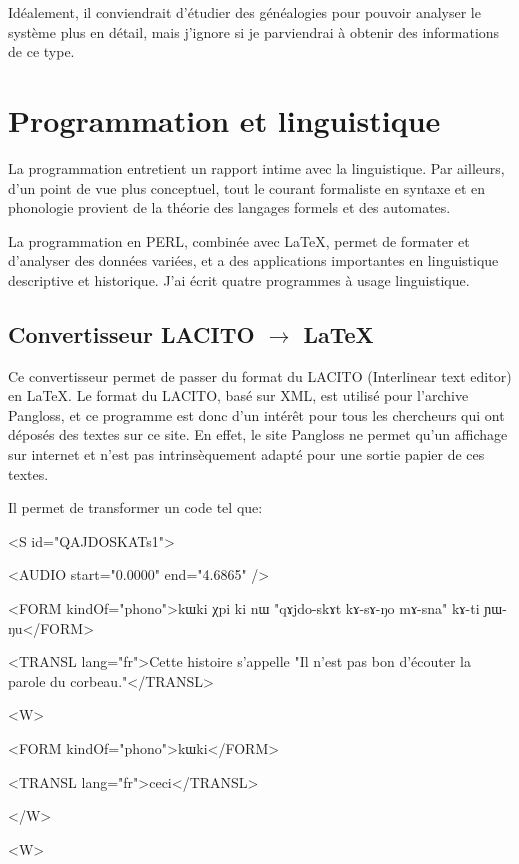 \documentclass[oldfontcommands,oneside,a4paper,11pt]{memoir}
\begin{document}
Idéalement, il conviendrait d'étudier des généalogies pour pouvoir analyser le système plus en détail, mais j'ignore si je parviendrai à obtenir des informations de ce type.
 
\chapter{Programmation et linguistique}
La programmation entretient un rapport intime avec la linguistique.  Par ailleurs, d'un point de vue plus conceptuel, tout le courant formaliste en syntaxe et en phonologie provient de la théorie des langages formels et des automates. 



La programmation en PERL, combinée avec \LaTeX, permet de formater et d'analyser des données variées, et a des applications importantes en linguistique descriptive et   historique. J'ai écrit quatre programmes à usage linguistique.


\section{Convertisseur LACITO $\rightarrow $ \LaTeX}
Ce convertisseur permet de passer du format du LACITO (Interlinear text editor) en \LaTeX{}. Le format du LACITO, basé sur XML, est utilisé pour l'archive Pangloss, et ce programme est donc d'un intérêt pour tous les chercheurs qui ont déposés des textes sur ce site. En effet, le site Pangloss ne permet qu'un affichage sur internet et n'est pas intrinsèquement adapté pour une sortie papier de ces textes. 

Il permet de transformer un code tel que:



 <S id="QAJDOSKATs1">
 
 
    <AUDIO start="0.0000" end="4.6865" />
    
    
    <FORM kindOf="phono">kɯki χpi ki nɯ "qɤjdo-skɤt  kɤ-sɤ-ŋo mɤ-sna" kɤ-ti ɲɯ-ŋu</FORM>
    
    
    <TRANSL lang="fr">Cette histoire s'appelle "Il n'est pas bon d'écouter la parole du corbeau."</TRANSL>
    
    
    <W>
    
    
      <FORM kindOf="phono">kɯki</FORM>
      
      
      <TRANSL lang="fr">ceci</TRANSL>
      
      
    </W>
    
    
    <W>
    
\end{document}
